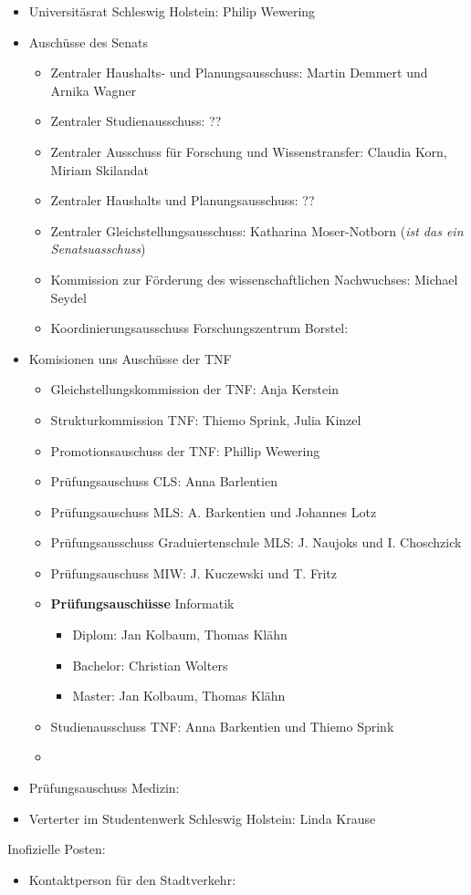 \documentclass[landscape,a0b,final]{a0poster}
\begin{document}
\begin{itemize}
	\item Universitäsrat Schleswig Holstein: Philip Wewering
	\item Auschüsse des Senats
	\begin{itemize} 
		\item Zentraler Haushalts- und Planungsausschuss: Martin Demmert und Arnika Wagner
		\item Zentraler Studienausschuss: ??
		\item Zentraler Ausschuss für Forschung und Wissenstransfer: Claudia Korn, Miriam Skilandat
		\item Zentraler Haushalts und Planungsausschuss: ??
		\item Zentraler Gleichstellungsausschuss: Katharina Moser-Notborn (\textit{ist das ein Senatsuasschuss})
		\item Kommission zur Förderung des wissenschaftlichen Nachwuchses: Michael Seydel
		\item Koordinierungsausschuss Forschungszentrum Borstel: 
	\end{itemize}
	\item Komisionen uns Auschüsse der TNF
	\begin{itemize}
		\item Gleichstellungskommission der TNF: Anja Kerstein
		\item Strukturkommission TNF: Thiemo Sprink, Julia Kinzel
		\item Promotionsauschuss der TNF: Phillip Wewering
		\item Prüfungsauschuss CLS: Anna Barlentien
		\item Prüfungsauschuss MLS: A. Barkentien und Johannes Lotz
		\item Prüfungsausschuss Graduiertenschule MLS: J. Naujoks und I. Choschzick
		\item Prüfungsauschuss MIW: J. Kuczewski  und T. Fritz
		\item \textbf{Prüfungsauschüsse} Informatik 
		\begin{itemize}
			\item Diplom: Jan Kolbaum, Thomas Klähn
			\item Bachelor: Christian Wolters
			\item Master: Jan Kolbaum, Thomas Klähn
		\end{itemize}
		\item Studienausschuss TNF: Anna Barkentien und Thiemo Sprink
		\item 
	\end{itemize}
	\item Prüfungsauschuss Medizin:
	\item Verterter im Studentenwerk Schleswig Holstein: Linda Krause
\end{itemize}
Inofizielle Posten:
\begin{itemize}
\item Kontaktperson für den Stadtverkehr:
\end{itemize}
\end{document}
